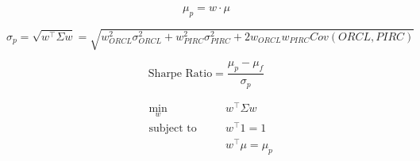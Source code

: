 \documentclass[12pt,a4paper]{report}
\begin{document}
\begin{equation}
	\label{eq:expected-return}
	\mu_p=w\cdot\mu
\end{equation}

\begin{equation}
	\label{eq:portfolio-variance}
	\sigma_{p} = \sqrt{w^\top \Sigma w} = \sqrt{w_{ORCL}^2 \sigma_{ORCL}^2 + w_{PIRC}^2 \sigma_{PIRC}^2 + 2 w_{ORCL} w_{PIRC}Cov(ORCL, PIRC)}
\end{equation}

\begin{equation}
	\label{eq:sharpe-ratio}
	\text{Sharpe Ratio} = \frac{\mu_{p} - \mu_{f}}{\sigma_{p}}
\end{equation}

\begin{equation}
	\label{eq:constrained-optimization-problem}
	\begin{aligned}& \min_{w} \quad && w^\top \Sigma w \\ & \text{subject to} \quad && w^\top 1 = 1 \\ & && w ^\top \mu = \mu_{p} \end{aligned}
\end{equation}

\clearpage
\nocite{*}
\printbibliography
\end{document}
